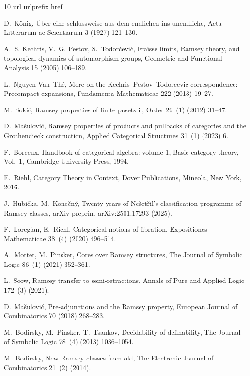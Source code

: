 \documentclass[preprint,12pt]{elsarticle}
\begin{document}
\begin{thebibliography}{10}
\expandafter\ifx\csname url\endcsname\relax
  \def\url#1{\texttt{#1}}\fi
\expandafter\ifx\csname urlprefix\endcsname\relax\def\urlprefix{URL }\fi
\expandafter\ifx\csname href\endcsname\relax
  \def\href#1#2{#2} \def\path#1{#1}\fi

D.~K\H{o}nig, Über eine schlussweise aus dem endlichen ins unendliche, Acta
  Litterarum ac Scientiarum 3 (1927) 121--130.

A.~S. Kechris, V.~G. Pestov, S.~Todor\v{c}evi\'c, Fra\" iss\'e limits, {R}amsey
  theory, and topological dynamics of automorphism groups, Geometric and
  Functional Analysis 15 (2005) 106--189.

L.~Nguyen Van~Th\'e, More on the {K}echris–{P}estov–{T}odorcevic
  correspondence: {P}recompact expansions, Fundamenta Mathematicae 222 (2013)
  19--27.

M.~Soki{\'c}, Ramsey properties of finite posets ii, Order 29~(1) (2012)
  31--47.

D.~Ma{\v{s}}ulovi{\'c}, Ramsey properties of products and pullbacks of
  categories and the {G}rothendieck construction, Applied Categorical
  Structures 31~(1) (2023) 6.

F.~Borceux, Handbook of categorical algebra: volume 1, Basic category theory,
  Vol.~1, Cambridge University Press, 1994.

E.~Riehl, Category Theory in Context, Dover Publications, Mineola, New York,
  2016.

J.~Hubi{\v c}ka, M.~Kone{\v c}n\'y, Twenty years of {N}e\v set\v ril's
  classification programme of {R}amsey classes, arXiv preprint arXiv:2501.17293
  (2025).

F.~Loregian, E.~Riehl, Categorical notions of fibration, Expositiones
  Mathematicae 38~(4) (2020) 496--514.

A.~Mottet, M.~Pinsker, Cores over {R}amsey structures, The Journal of Symbolic
  Logic 86~(1) (2021) 352--361.

L.~Scow, Ramsey transfer to semi-retractions, Annals of Pure and Applied Logic
  172~(3) (2021).

D.~Ma{\v{s}}ulovi{\'c}, Pre-adjunctions and the {R}amsey property, European
  Journal of Combinatorics 70 (2018) 268--283.

M.~Bodirsky, M.~Pinsker, T.~Tsankov, Decidability of definability, The Journal
  of Symbolic Logic 78~(4) (2013) 1036--1054.

M.~Bodirsky, New {R}amsey classes from old, The Electronic Journal of
  Combinatorics 21~(2) (2014).

\end{thebibliography}
\end{document}
